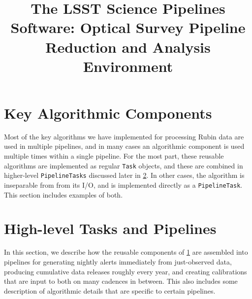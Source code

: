\documentclass[twocolumn,longbib]{aastex7}
\begin{document}
\title{The LSST Science Pipelines Software: Optical Survey Pipeline Reduction and Analysis Environment}











\section{Key Algorithmic Components}
\label{sec:components}

Most of the key algorithms we have implemented for processing Rubin data are used in multiple pipelines, and in many cases an algorithmic component is used multiple times within a single pipeline.
For the most part, these reusable algorithms are implemented as regular \texttt{Task} objects, and these are combined in higher-level \texttt{PipelineTasks} discussed later in \ref{sec:tasks-and-pipelines}.
In other cases, the algorithm is inseparable from from its I/O, and is implemented directly as a \texttt{PipelineTask}.
This section includes examples of both.









\section{High-level Tasks and Pipelines}
\label{sec:tasks-and-pipelines}

In this section, we describe how the reusable components of \ref{sec:components} are assembled into pipelines for generating nightly alerts immediately from just-observed data, producing cumulative data releases roughly every year, and creating calibrations that are input to both on many cadences in between.
This also includes some description of algorithmic details that are specific to certain pipelines.
\end{document}
